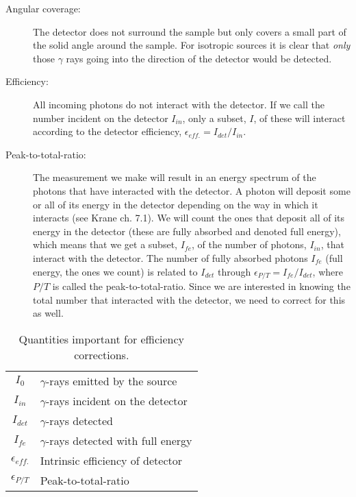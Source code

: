 \documentclass[12pt]{article}
\begin{document}
\begin{description}
\item[Angular coverage:] The detector does not surround the sample but
    only covers a small part of the solid angle around the sample. For
      isotropic sources it is clear that \emph{only} those $\gamma$ rays
        going into the direction of the detector would be detected.
\item[Efficiency:] All incoming photons do not interact with the
  detector. If we call the number incident on the detector $I_{in}$, only a
  subset, $I$, of these will interact according to the detector
  efficiency, $\epsilon_{eff.}=I_{det}/I_{in}$.
\item[Peak-to-total-ratio:] The measurement we make will result in an
  energy spectrum of the photons that have interacted with the
  detector. A photon will deposit some or all of its energy in the
  detector depending on the way in which it interacts (see Krane ch. 7.1). We will count the ones that deposit all of its energy in
  the detector (these are fully absorbed and denoted full energy), which means that we get a subset,
  $I_{fe}$, of the number of photons, $I_{in}$, that interact with the
  detector. The number of fully absorbed photons $I_{fe}$ (full energy, the ones we
  count) is related to $I_{det}$ through $\epsilon_{P/T} = I_{fe}/I_{det}$, where
  $P/T$ is called the peak-to-total-ratio. Since we are interested in
  knowing the total number that interacted with the detector, we need
  to correct for this as well.
\end{description}

\begin{table}[H]
  \centering
  \caption{Quantities important for efficiency corrections.}
\begin{tabular}{c l}
  \hline
  $I_0$ & $\gamma$-rays emitted by the source \\
  $I_{in}$ & $\gamma$-rays incident on the detector \\
  $I_{det}$ & $\gamma$-rays detected \\
  $I_{fe}$ & $\gamma$-rays detected with full energy \\
  \hline
  $\epsilon_{eff.}$ & Intrinsic efficiency of detector \\
  $\epsilon_{P/T}$ & Peak-to-total-ratio \\
\end{tabular}
\label{tab:I}
\end{table}
\end{document}
